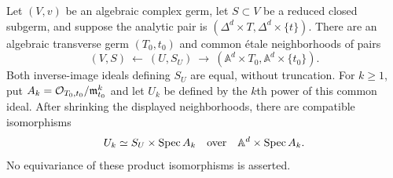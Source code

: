 \begin{lemma}\label{str:marked-artin}
Let $(V,v)$ be an algebraic complex germ, let $S\subset V$ be a reduced
closed subgerm, and suppose the analytic pair is
$(\Delta^d\times T,\Delta^d\times\{t\})$.  There are an algebraic
transverse germ $(T_0,t_0)$ and common \'etale neighborhoods of pairs
\begin{equation}\label{str:etale-product-pair}
 (V,S)\ \longleftarrow\ (U,S_U)\ \longrightarrow\
 (\mathbb A^d\times T_0,\mathbb A^d\times\{t_0\}).
\end{equation}
Both inverse-image ideals defining $S_U$ are equal, without truncation.
For $k\geq1$, put $A_k=\mathcal O_{T_0,t_0}/\mathfrak m_{t_0}^k$ and let $U_k$
be defined by the $k$th power of this common ideal.  After shrinking the
displayed neighborhoods, there are compatible isomorphisms
\begin{equation}\label{str:finite-product}
 U_k\simeq S_U\times\operatorname{Spec} A_k
 \quad\text{over}\quad \mathbb A^d\times\operatorname{Spec} A_k.
\end{equation}
No equivariance of these product isomorphisms is asserted.
\end{lemma}

